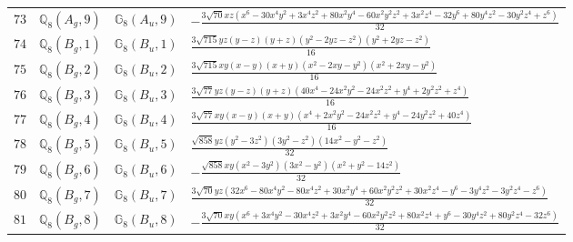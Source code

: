 \documentclass[fleqn,8pt,landscape]{jsarticle}
\begin{document}
\begin{table}[ht!]
\begin{center}
\begin{tabular}{cccl}
$ 73 $ & $ \mathbb{Q}_{8}(A_{g},9) $ & $ \mathbb{G}_{8}(A_{u},9) $ & $ - \frac{3 \sqrt{70} x z \left(x^{6} - 30 x^{4} y^{2} + 3 x^{4} z^{2} + 80 x^{2} y^{4} - 60 x^{2} y^{2} z^{2} + 3 x^{2} z^{4} - 32 y^{6} + 80 y^{4} z^{2} - 30 y^{2} z^{4} + z^{6}\right)}{32} $ \\
$ 74 $ & $ \mathbb{Q}_{8}(B_{g},1) $ & $ \mathbb{G}_{8}(B_{u},1) $ & $ \frac{3 \sqrt{715} y z \left(y - z\right) \left(y + z\right) \left(y^{2} - 2 y z - z^{2}\right) \left(y^{2} + 2 y z - z^{2}\right)}{16} $ \\
$ 75 $ & $ \mathbb{Q}_{8}(B_{g},2) $ & $ \mathbb{G}_{8}(B_{u},2) $ & $ \frac{3 \sqrt{715} x y \left(x - y\right) \left(x + y\right) \left(x^{2} - 2 x y - y^{2}\right) \left(x^{2} + 2 x y - y^{2}\right)}{16} $ \\
$ 76 $ & $ \mathbb{Q}_{8}(B_{g},3) $ & $ \mathbb{G}_{8}(B_{u},3) $ & $ \frac{3 \sqrt{77} y z \left(y - z\right) \left(y + z\right) \left(40 x^{4} - 24 x^{2} y^{2} - 24 x^{2} z^{2} + y^{4} + 2 y^{2} z^{2} + z^{4}\right)}{16} $ \\
$ 77 $ & $ \mathbb{Q}_{8}(B_{g},4) $ & $ \mathbb{G}_{8}(B_{u},4) $ & $ \frac{3 \sqrt{77} x y \left(x - y\right) \left(x + y\right) \left(x^{4} + 2 x^{2} y^{2} - 24 x^{2} z^{2} + y^{4} - 24 y^{2} z^{2} + 40 z^{4}\right)}{16} $ \\
$ 78 $ & $ \mathbb{Q}_{8}(B_{g},5) $ & $ \mathbb{G}_{8}(B_{u},5) $ & $ \frac{\sqrt{858} y z \left(y^{2} - 3 z^{2}\right) \left(3 y^{2} - z^{2}\right) \left(14 x^{2} - y^{2} - z^{2}\right)}{32} $ \\
$ 79 $ & $ \mathbb{Q}_{8}(B_{g},6) $ & $ \mathbb{G}_{8}(B_{u},6) $ & $ - \frac{\sqrt{858} x y \left(x^{2} - 3 y^{2}\right) \left(3 x^{2} - y^{2}\right) \left(x^{2} + y^{2} - 14 z^{2}\right)}{32} $ \\
$ 80 $ & $ \mathbb{Q}_{8}(B_{g},7) $ & $ \mathbb{G}_{8}(B_{u},7) $ & $ \frac{3 \sqrt{70} y z \left(32 x^{6} - 80 x^{4} y^{2} - 80 x^{4} z^{2} + 30 x^{2} y^{4} + 60 x^{2} y^{2} z^{2} + 30 x^{2} z^{4} - y^{6} - 3 y^{4} z^{2} - 3 y^{2} z^{4} - z^{6}\right)}{32} $ \\
$ 81 $ & $ \mathbb{Q}_{8}(B_{g},8) $ & $ \mathbb{G}_{8}(B_{u},8) $ & $ - \frac{3 \sqrt{70} x y \left(x^{6} + 3 x^{4} y^{2} - 30 x^{4} z^{2} + 3 x^{2} y^{4} - 60 x^{2} y^{2} z^{2} + 80 x^{2} z^{4} + y^{6} - 30 y^{4} z^{2} + 80 y^{2} z^{4} - 32 z^{6}\right)}{32} $ \\
 \hline \hline
\end{tabular}
\end{center}
\end{table}
\end{document}
